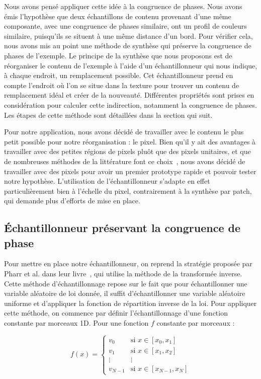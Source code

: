 Nous avons pensé appliquer cette idée à la congruence de phases. Nous avons émis l'hypothèse que deux échantillons de contenu provenant d'une même composante, avec une congruence de phases similaire, ont un profil de couleurs similaire, puisqu'ils se situent à une même distance d'un bord. Pour vérifier cela, nous avons mis au point une méthode de synthèse qui préserve la congruence de phases de l'exemple. Le principe de la synthèse que nous proposons est de réorganiser le contenu de l'exemple à l'aide d'un échantillonneur qui nous indique, à chaque endroit, un remplacement possible. Cet échantillonneur prend en compte l'endroit où l'on se situe dans la texture pour trouver un contenu de remplacement idéal et créer de la nouveauté. Différentes propriétés sont prises en considération pour calculer cette indirection, notamment la congruence de phases. Les étapes de cette méthode sont détaillées dans la section qui suit.

Pour notre application, nous avons décidé de travailler avec le contenu le plus petit possible pour notre réorganisation : le pixel. Bien qu'il y ait des avantages à travailler avec des petites régions de pixels pluôt que des pixels unitaires, et que de nombreuses méthodes de la littérature font ce choix~\cite{wei_state_2009}, nous avons décidé de travailler avec des pixels pour avoir un premier prototype rapide et pouvoir tester notre hypothèse. L'utilisation de l'échantillonneur s'adapte en effet particulièrement bien à l'échelle du pixel, contrairement à la synthèse par patch, qui demande plus d'efforts de mise en place.

\subsection{Échantillonneur préservant la congruence de phase}

Pour mettre en place notre échantillonneur, on reprend la stratégie proposée par Pharr et al. dans leur livre~\cite{pharr_physically_2023}, qui utilise la méthode de la transformée inverse. Cette méthode d'échantillonnage repose sur le fait que pour échantillonner une variable aléatoire de loi donnée, il suffit d'échantillonner une variable aléatoire uniforme et d'appliquer la fonction de répartition inverse de la loi. Pour appliquer cette méthode, on commence par définir l'échantillonnage d'une fonction constante par morceaux 1D. Pour une fonction $f$ constante par morceaux :


\begin{equation}
    f(x) = \left\{
        \begin{array}{ll}
            v_0 & \mbox{si } x \in [x_0, x_1] \\
            v_1 & \mbox{si } x \in [x_1, x_2] \\
            \vdots & \vdots \\
            v_{N-1} & \mbox{si } x \in [x_{N-1}, x_N]
        \end{array}
    \right.
\end{equation}


